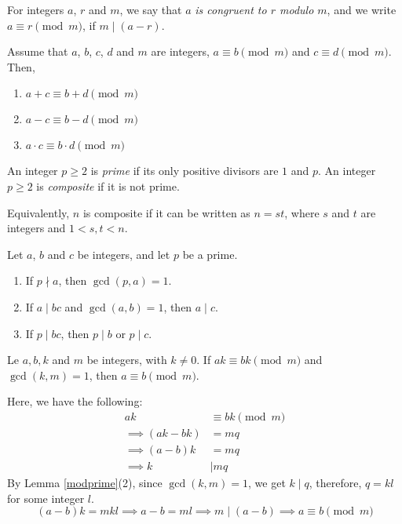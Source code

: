 \begin{definition} \label{mod}
	For integers $a$, $r$ and $m$, we say that $a$ \emph{is congruent to $r$ modulo $m$}, and we write $a \equiv r \pmod m$, if $m \mid (a-r)$.
\end{definition}

\begin{proposition} \label{modprop}
	Assume that $a$, $b$, $c$, $d$ and $m$ are integers, $a \equiv b \pmod m$ and $c \equiv d \pmod m$. Then,

	\begin{enumerate}
		\item $a + c \equiv b + d \pmod m$
		\item $a - c \equiv b - d \pmod m$
		\item $a \cdot c \equiv b \cdot d \pmod m$
	\end{enumerate}
\end{proposition}

\begin{definition} \label{prime}
	An integer $p \geq 2$ is \emph{prime} if its only positive divisors are $1$ and $p$. An integer $p \geq 2$ is \emph{composite} if it is not prime.

	Equivalently, $n$ is composite if it can be written as $n = st$, where $s$ and $t$ are integers and $1 < s,t < n$.
\end{definition}

\begin{lemma} \label{modprime}
	Let $a$, $b$ and $c$ be integers, and let $p$ be a prime.
	\begin{enumerate}
		\item If $p \nmid a$, then $\gcd(p, a) = 1$.
		\item If $a \mid bc$ and $\gcd(a, b) = 1$, then $a \mid c$.
		\item If $p \mid bc$, then $p \mid b$ or $p \mid c$.
	\end{enumerate}
\end{lemma}

\begin{proposition} \label{modcancel}
	Le $a, b, k$ and $m$ be integers, with $k \neq 0$. If $ak \equiv bk \pmod m$ and $\gcd(k,m) = 1$, then $a \equiv b \pmod m$.
\end{proposition}

\begin{scratch}
	Here, we have the following:
	\begin{align}
		ak &\equiv bk \pmod m \\
		\implies (ak - bk) &= mq \\
		\implies (a-b)k &= mq \\
		\implies k &\mid mq
	\end{align}
	By Lemma \ref{modprime}(2), since $\gcd(k,m)=1$, we get $k \mid q$, therefore, $q = kl$ for some integer $l$.
	$$(a-b)k = mkl \implies a-b = ml \implies m \mid (a-b) \implies a \equiv b \pmod m$$
\end{scratch}

